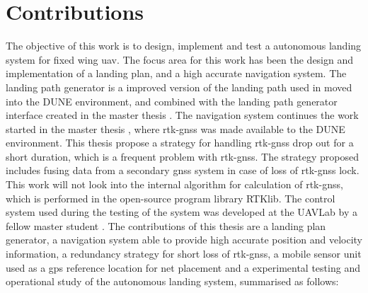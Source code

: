 \section{Contributions}
The objective of this work is to design, implement and test a autonomous landing system for fixed wing \gls{uav}. The focus area for this work has been the design and implementation of a landing plan, and a high accurate navigation system. The landing path generator is a improved version of the landing path used in \citep{Skulstad&Syversen} moved into the DUNE environment, and combined with the landing path generator interface created in the master thesis \citep{Froelich}. The navigation system continues the work started in the master thesis \citep{Spockeli}, where \gls{rtk-gnss} was made available to the DUNE environment. This thesis propose a strategy for handling \gls{rtk-gnss} drop out for a short duration, which is a frequent problem with \gls{rtk-gnss}. The strategy proposed includes fusing data from a secondary \gls{gnss} system in case of loss of \gls{rtk-gnss} lock. This work will not look into the internal algorithm for calculation of \gls{rtk-gnss}, which is performed in the open-source program library RTKlib. The control system used during the testing of the system was developed at the UAVLab by a fellow master student \citep{Sigurd}. The contributions of this thesis are a landing plan generator, a navigation system able to provide high accurate position and velocity information, a redundancy strategy for short loss of \gls{rtk-gnss}, a mobile sensor unit used as a \gls{gps} reference location for net placement and a experimental testing and operational study of the autonomous landing system, summarised as follows:
